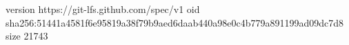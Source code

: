 version https://git-lfs.github.com/spec/v1
oid sha256:51441a4581f6e95819a38f79b9aed6daab440a98e0c4b779a891199ad09dc7d8
size 21743
